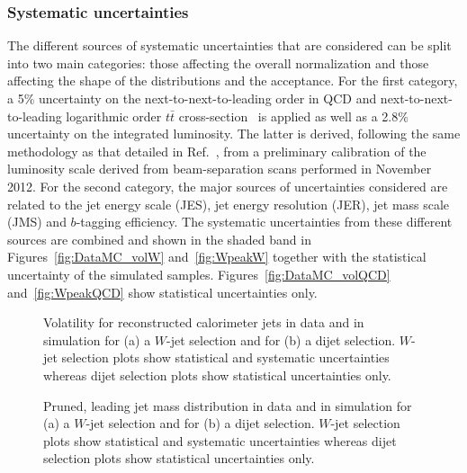 \subsubsection*{Systematic uncertainties}

The different sources of systematic uncertainties that are considered can be split into two main categories: those affecting the overall normalization and those affecting the shape of the distributions and the acceptance. For the first category, a 5\% uncertainty on the next-to-next-to-leading order in QCD and next-to-next-to-leading logarithmic order $t\bar{t}$ cross-section~\cite{Aliev:2010zk} is applied as well as a 2.8\% uncertainty on the integrated luminosity. The latter is derived, following the same methodology as that detailed in Ref.~\cite{Aad:2013ucp}, from a preliminary calibration of the luminosity scale derived from beam-separation scans performed in November 2012. For the second category, the major sources of uncertainties considered are related to the jet energy scale (JES), jet energy resolution (JER), jet mass scale (JMS) and $b$-tagging efficiency. The systematic uncertainties from these different sources are combined and shown in the shaded band in Figures~\ref{fig:DataMC_volW} and~\ref{fig:WpeakW} together with the statistical uncertainty of the simulated samples. Figures~\ref{fig:DataMC_volQCD} and~\ref{fig:WpeakQCD} show statistical uncertainties only.

\begin{figure}[htbp]
\centering
\caption{Volatility for reconstructed calorimeter jets in data and in simulation for (a) a $W$-jet selection and for (b) a dijet selection. $W$-jet selection plots show statistical and systematic uncertainties whereas dijet selection plots show statistical uncertainties only.}%
\label{fig:DataMC_vol}
\end{figure}

\begin{figure}[htbp]
\centering
{}
\caption{Pruned, leading jet mass distribution in data and in simulation for (a) a $W$-jet selection and for (b) a dijet selection. $W$-jet selection plots show statistical and systematic uncertainties whereas dijet selection plots show statistical uncertainties only.}
\label{fig:Wpeak}
\end{figure}

